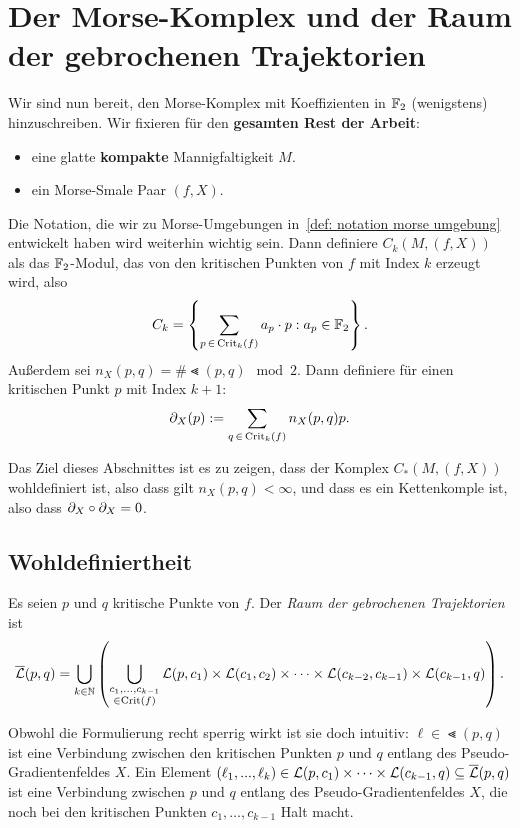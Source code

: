 \section{Der Morse-Komplex und der Raum der gebrochenen Trajektorien}

Wir sind nun bereit, den Morse-Komplex mit Koeffizienten in ${ \mathbb F }_2$ (wenigstens) hinzuschreiben.
Wir fixieren für den \textbf{gesamten Rest der Arbeit}: 
\begin{itemize}
    \item eine glatte \textbf{kompakte} Mannigfaltigkeit $M$.
    \item ein Morse-Smale Paar $(f, X)$.
\end{itemize}
Die Notation, die wir zu Morse-Umgebungen in~\ref{def: notation morse umgebung} entwickelt haben 
wird weiterhin wichtig sein. Dann definiere $C_k (M, (f, X))$ als das ${ \mathbb F }_2$-Modul, 
das von den kritischen Punkten von $f$ mit Index $k$ erzeugt wird, also
\[ C_k = \left\{ \sum_{p \, \in \, { \operatorname{Crit} }_k (f)} a_p \cdot p : a_p \in { \mathbb F }_2 \right\} . \] 
Außerdem sei 
$n_X(p, q) = \# \Lt (p, q) \mod 2$. Dann definiere für einen kritischen Punkt $p$ mit Index $k + 1$:
\[ { \partial }_X (p) := \sum_{q \, \in \, { \operatorname{Crit} }_{k}(f)} n_X(p, q)p . \]

Das Ziel dieses Abschnittes ist es zu zeigen, dass der Komplex $C_{\ast}(M, (f, X))$ wohldefiniert
ist, also dass gilt $n_X (p, q) < \infty$, und dass es ein Kettenkomple ist, also dass 
${ \partial }_X \circ { \partial }_X = 0$. 

\subsection*{Wohldefiniertheit}

\begin{definition}
    \label{def: raum der gebrochenen trajektorien}
    Es seien $p$ und $q$ kritische Punkte von $f$. Der \textit{Raum der gebrochenen Trajektorien} ist
    \[ {\overline{\mathcal{L}} } (p, q) = 
        \bigcup_{k \in { \mathbb N }} \left( \bigcup_{\substack{c_1, \dots, c_{k - 1} \\ \in { \operatorname{Crit} }(f)}} 
            { \mathcal{L} } (p, c_1) \times { \mathcal{L} } (c_1, c_2) \times \dots 
                \times { \mathcal{L} } (c_{k - 2}, c_{k - 1}) \times { \mathcal{L} } (c_{k - 1}, q) \right) . \]
\end{definition}

Obwohl die Formulierung recht sperrig wirkt ist sie doch intuitiv: 
$\ell \in \Lt (p, q)$ ist eine \glqq Verbindung\grqq{} zwischen den kritischen Punkten $p$ und $q$ 
entlang des Pseudo-Gradientenfeldes $X$. Ein Element 
$(\ell_1, ..., \ell_k) \in { \mathcal{L} } (p, c_1) \times \dots \times { \mathcal{L} } (c_{k - 1}, q) \subseteq {\overline{\mathcal{L}} } (p, q)$
ist eine \glqq Verbindung\grqq{} zwischen $p$ und $q$ entlang des Pseudo-Gradientenfeldes $X$, die noch 
bei den kritischen Punkten $c_1, \dots, c_{k - 1}$ \glqq Halt\grqq{} macht. 

